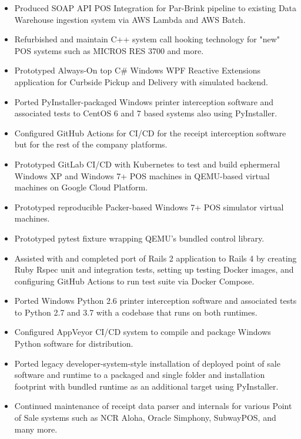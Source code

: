 \documentclass[10pt,letter,ragged2e]{altacv}
\begin{document}
\begin{paracol}{2}


\begin{itemize}
\item Produced SOAP API POS Integration for Par-Brink pipeline to existing Data Warehouse ingestion system via AWS Lambda and AWS Batch.
\item Refurbished and maintain C++ system call hooking technology for "new" POS systems such as MICROS RES 3700 and more.
\item Prototyped Always-On top C\# Windows WPF Reactive Extensions application for Curbside Pickup and Delivery with simulated backend.
\item Ported PyInstaller-packaged Windows printer interception software and associated tests to CentOS 6 and 7 based systems also using PyInstaller.
\item Configured GitHub Actions for CI/CD for the receipt interception software but for the rest of the company platforms.
\item Prototyped GitLab CI/CD with Kubernetes to test and build ephermeral Windows XP and Windows 7+ POS machines in QEMU-based virtual machines on Google Cloud Platform. 
\item Prototyped reproducible Packer-based Windows 7+ POS simulator virtual machines.
\item Prototyped pytest fixture wrapping QEMU's bundled control library. 
\item Assisted with and completed port of Rails 2 application to Rails 4 by creating Ruby Rspec unit and integration tests, setting up testing Docker images, and configuring GitHub Actions to run test suite via Docker Compose.
\item Ported Windows Python 2.6 printer interception software and associated tests to Python 2.7 and 3.7 with a codebase that runs on both runtimes.
\item Configured AppVeyor CI/CD system to compile and package Windows Python software for distribution.
\item Ported legacy developer-system-style installation of deployed point of sale software and runtime to a packaged and single folder and installation footprint with bundled runtime as an additional target using PyInstaller.
\item Continued maintenance of receipt data parser and internals for various Point of Sale systems such as NCR Aloha, Oracle Simphony, SubwayPOS, and many more.

\end{itemize}
\end{paracol}
\end{document}
